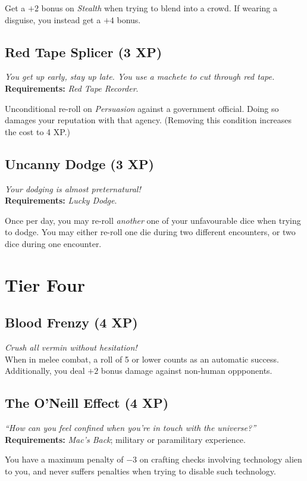 Get a $+2$ bonus on \textit{Stealth} when trying to blend into a crowd.
If wearing a disguise, you instead get a $+4$ bonus.

\subsection{Red Tape Splicer (3 XP)}
\textit{You get up early, stay up late. You use a machete to cut through red tape.}\\
\textbf{Requirements:} \textit{Red Tape Recorder}.

Unconditional re-roll on \textit{Persuasion} against a government official.
Doing so damages your reputation with that agency.
(Removing this condition increases the cost to 4 XP.)

\subsection{Uncanny Dodge (3 XP)}
\textit{Your dodging is almost preternatural!}\\
\textbf{Requirements:} \textit{Lucky Dodge}.

Once per day, you may re-roll \textit{another} one of your unfavourable dice when trying to dodge.
You may either re-roll one die during two different encounters, or two dice during one encounter.

\section{Tier Four}

\subsection{Blood Frenzy (4 XP)}
\textit{Crush all vermin without hesitation!}\\
When in melee combat, a roll of 5 or lower counts as an automatic success.
Additionally, you deal $+2$ bonus damage against non-human oppponents.

\subsection{The O'Neill Effect (4 XP)}
\textit{``How can you feel confined when you're in touch with the universe?''}\\
\textbf{Requirements:} \textit{Mac's Back}; military or paramilitary experience. 

You have a maximum penalty of $-3$ on crafting checks involving technology alien to you, and never suffers penalties when trying to disable such technology.

